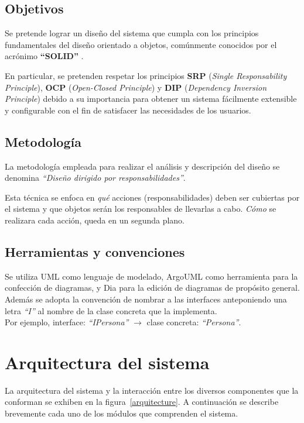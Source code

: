 \documentclass[12pt,a4paper,spanish]{article}
\begin{document}
\subsection{Objetivos}
Se pretende lograr un diseño del sistema que cumpla con los principios
fundamentales del diseño orientado a objetos, comúnmente conocidos por el
acrónimo \textbf{``SOLID''} \cite{martin}.

En particular, se pretenden respetar los principios \textbf{SRP}
(\textit{Single Responsability Principle}), \textbf{OCP} (\textit{Open-Closed
Principle}) y \textbf{DIP} (\textit{Dependency Inversion Principle})
debido a su importancia para obtener un sistema f\'acilmente extensible
y configurable con el fin de satisfacer las necesidades de los usuarios.
  
\subsection{Metodología}
La metodología empleada para realizar el análisis y descripción del
diseño se denomina \emph{``Diseño dirigido por responsabilidades''}\cite{rebecca}. 

Esta técnica se enfoca en \textit{qué} acciones
(responsabilidades) deben ser cubiertas por el sistema 
y que objetos serán los responsables de llevarlas a cabo.
\textit{Cómo} se realizara cada acción, queda en un segunda plano.

\subsection{Herramientas y convenciones}
Se utiliza UML\cite{uml} como lenguaje de modelado, ArgoUML\cite{argoUML}
como herramienta para la confección de diagramas, y Dia\cite{dia} para la edición
de diagramas de propósito general. Además se adopta la convención de nombrar a
 las interfaces anteponiendo una letra \textit{``I''} al nombre de la clase concreta
que la implementa. \\
Por ejemplo, interface: \textit{``IPersona''} $\to$
clase concreta: \textit{``Persona''}.

\section{Arquitectura del sistema}
\label{arquitectura}
La arquitectura del sistema y la interacción entre los diversos componentes que la conforman se exhiben en la figura~\ref{arquitecture}.	A continuación se describe brevemente cada uno de los módulos que comprenden el sistema.
\end{document}

